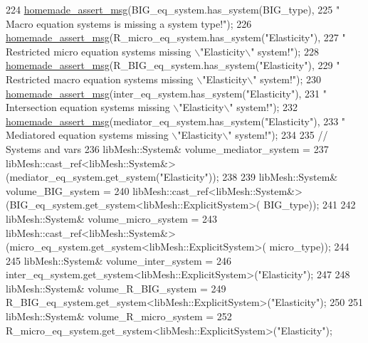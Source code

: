 \begin{DoxyCode}
224         \hyperlink{common__header_8h_a593ccc80b790b2268653fcf6597bf451}{homemade\_assert\_msg}(BIG\_eq\_system.has\_system(BIG\_type),
225                 \textcolor{stringliteral}{" Macro equation systems is missing a system type!"});
226         \hyperlink{common__header_8h_a593ccc80b790b2268653fcf6597bf451}{homemade\_assert\_msg}(R\_micro\_eq\_system.has\_system(\textcolor{stringliteral}{"Elasticity"}),
227                 \textcolor{stringliteral}{" Restricted micro equation systems missing \(\backslash\)"Elasticity\(\backslash\)" system!"});
228         \hyperlink{common__header_8h_a593ccc80b790b2268653fcf6597bf451}{homemade\_assert\_msg}(R\_BIG\_eq\_system.has\_system(\textcolor{stringliteral}{"Elasticity"}),
229                 \textcolor{stringliteral}{" Restricted macro equation systems missing \(\backslash\)"Elasticity\(\backslash\)" system!"});
230         \hyperlink{common__header_8h_a593ccc80b790b2268653fcf6597bf451}{homemade\_assert\_msg}(inter\_eq\_system.has\_system(\textcolor{stringliteral}{"Elasticity"}),
231                 \textcolor{stringliteral}{" Intersection equation systems missing \(\backslash\)"Elasticity\(\backslash\)" system!"});
232         \hyperlink{common__header_8h_a593ccc80b790b2268653fcf6597bf451}{homemade\_assert\_msg}(mediator\_eq\_system.has\_system(\textcolor{stringliteral}{"Elasticity"}),
233                 \textcolor{stringliteral}{" Mediatored equation systems missing \(\backslash\)"Elasticity\(\backslash\)" system!"});
234 
235         \textcolor{comment}{// Systems and vars}
236         libMesh::System& volume\_mediator\_system =
237                 libMesh::cast\_ref<libMesh::System&>(mediator\_eq\_system.get\_system(\textcolor{stringliteral}{"Elasticity"}));
238 
239         libMesh::System& volume\_BIG\_system =
240                 libMesh::cast\_ref<libMesh::System&>(BIG\_eq\_system.get\_system<libMesh::ExplicitSystem>(
      BIG\_type));
241 
242         libMesh::System& volume\_micro\_system =
243                 libMesh::cast\_ref<libMesh::System&>(micro\_eq\_system.get\_system<libMesh::ExplicitSystem>(
      micro\_type));
244 
245         libMesh::System& volume\_inter\_system =
246                 inter\_eq\_system.get\_system<libMesh::ExplicitSystem>(\textcolor{stringliteral}{"Elasticity"});
247 
248         libMesh::System& volume\_R\_BIG\_system =
249                 R\_BIG\_eq\_system.get\_system<libMesh::ExplicitSystem>(\textcolor{stringliteral}{"Elasticity"});
250 
251         libMesh::System& volume\_R\_micro\_system =
252                 R\_micro\_eq\_system.get\_system<libMesh::ExplicitSystem>(\textcolor{stringliteral}{"Elasticity"});

\end{DoxyCode}
